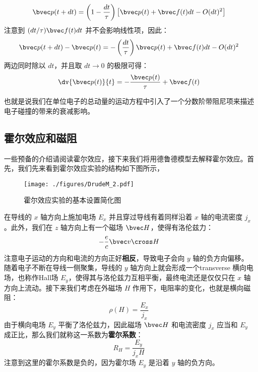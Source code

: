 \begin{equation}
\bvec p(t+dt)=\left(1-\frac{dt}{\tau}\right)\left[\bvec p(t)+\bvec f(t)dt - O(dt)^2\right]
\end{equation}
注意到 $(dt/\tau)\bvec f(t)dt$ 并不会影响线性项，因此：
\begin{equation}
\bvec p(t+dt)-\bvec p(t)=-\left(\frac{dt}{\tau}\right)\bvec p(t)+\bvec f(t)dt - O(dt)^2
\end{equation}
两边同时除以 $dt$，并且取 $dt\rightarrow 0$ 的极限可得：
\begin{equation}\label{DrudeM_eq3}
\dv{\bvec p(t)}{t}= -\frac{\bvec p(t)}{\tau}+\bvec f(t)
\end{equation}

也就是说我们在单位电子的总动量的运动方程中引入了一个分数阶带阻尼项来描述电子碰撞的带来的衰减影响。
\subsection{霍尔效应和磁阻}
一些预备的介绍请阅读霍尔效应，接下来我们将用德鲁德模型去解释霍尔效应。首先，我们先来看到霍尔效应实验的结构如下图所示，
\begin{figure}[ht]
\centering
\texttt{[image: ./figures/DrudeM\_2.pdf]}
\caption{霍尔效应实验的基本设置简化图} \label{DrudeM_fig2}
\end{figure}
在导线的 $x$ 轴方向上施加电场 $E_x$ 并且穿过导线有着同样沿着 $x$ 轴的电流密度 $j_x$。此外，我们在 $z$ 轴方向上有一个磁场 $\bvec H$，使得有洛伦兹力：
\begin{equation}
-\frac{e}{c}\bvec v \cross H
\end{equation}
注意电子运动的方向和电流的方向正好\textbf{相反}，导致电子会向 $y$ 轴的负方向偏移。随着电子不断在导线一侧聚集，导线的 $y$ 轴方向上就会形成一个transverse 横向电场，也称作Hall场 $E_y$，使得其与洛伦兹力互相平衡，最终电流还是仅仅只在 $x$ 轴方向上流动。接下来我们考虑在外磁场 $H$ 作用下，电阻率的变化，也就是横向磁阻：
\begin{equation}
\rho(H)=\frac{E_x}{j_x}
\end{equation}
由于横向电场 $E_y$ 平衡了洛伦兹力，因此磁场 $\bvec H$ 和电流密度 $j_x$ 应当和 $E_y$ 成正比，那么我们就称这一系数为\textbf{霍尔系数}：
\begin{equation}\label{DrudeM_eq5}
R_H = \frac{E_y}{j_xH}
\end{equation}
注意到这里的霍尔系数是负的，因为霍尔场 $E_y$ 是沿着 $y$ 轴的负方向。

